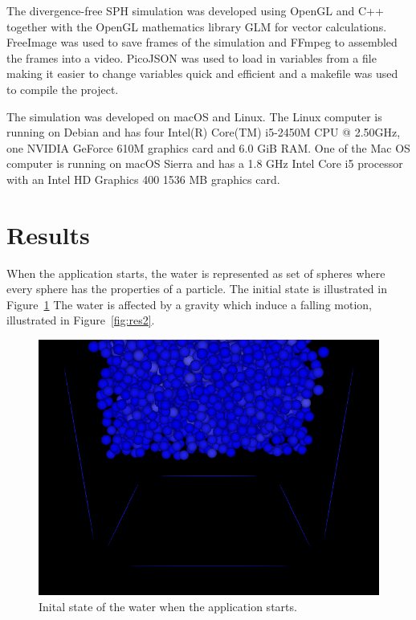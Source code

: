     The divergence-free SPH simulation was developed using OpenGL and C++ together with the OpenGL mathematics library GLM for vector calculations.
    FreeImage was used to save frames of the simulation and FFmpeg to assembled the frames into a video.
    PicoJSON was used to load in variables from a file making it easier to change variables quick and efficient and a makefile was used to compile the project.

    The simulation was developed on macOS and Linux.
    The Linux computer is running on Debian and has four Intel(R) Core(TM) i5-2450M CPU @ 2.50GHz, one NVIDIA GeForce 610M graphics card and 6.0 GiB RAM.
    One of the Mac OS computer is running on macOS Sierra and has a 1.8 GHz Intel Core i5 processor with an Intel HD Graphics 400 1536 MB graphics card.


\section{Results}

	When the application starts, the water is represented as set of spheres where every sphere has the properties of a particle.
	The initial state is illustrated in Figure~\ref{fig:res1}
	The water is affected by a gravity which induce a falling motion, illustrated in Figure~\ref{fig:res2}.

	\begin{figure}[h!]
		\includegraphics[width=\linewidth]{img/frame0001.png}
		\caption{Inital state of the water when the application starts.}
		\label{fig:res1}
	\end{figure}

